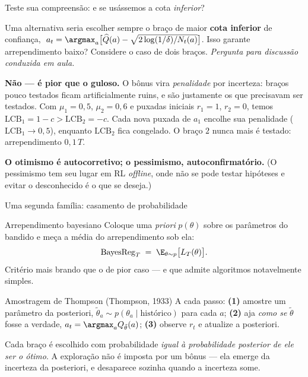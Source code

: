 \documentclass[aspectratio=169, 10pt]{beamer}
\newcommand{\paradiscussao}{\smallskip
  {\footnotesize\color{rlCinza}\itshape Pergunta para discussão conduzida em aula.}}
\newcommand{\Qhat}{\widehat{Q}}
\newcommand{\Nc}{N}                         %
\newcommand{\LCB}{\mathrm{LCB}}
\newcommand{\Reg}{L}
\begin{document}
\begin{frame}{Teste sua compreensão: e se usássemos a cota \emph{inferior}?}
  \begin{quizbox}{}
    Uma alternativa seria escolher sempre o braço de maior \textbf{cota
    inferior} de confiança,
    $\;a_t = \argmax_a \bigl[\Qhat(a) - \sqrt{2\log(1/\delta)/\Nc_t(a)}\bigr]$.
    Isso garante arrependimento baixo? Considere o caso de dois braços.
    \paradiscussao
  \end{quizbox}

  \pause

  \begin{respbox}[fontupper=\footnotesize]
    \textbf{Não --- é pior que o guloso.} O bônus vira \emph{penalidade}
    por incerteza: braços pouco testados ficam artificialmente ruins, e são
    justamente os que precisavam ser testados. Com
    $\mu_1 = 0{,}5$, $\mu_2 = 0{,}6$ e puxadas iniciais $r_1 = 1$,
    $r_2 = 0$, temos $\LCB_1 = 1 - c > \LCB_2 = -c$. Cada nova puxada de
    $a_1$ encolhe sua penalidade ($\LCB_1 \to 0{,}5$), enquanto $\LCB_2$
    fica congelado. O braço $2$ nunca mais é testado: arrependimento
    $0{,}1\,T$.
  \end{respbox}

  \begin{ideiabox}[fontupper=\footnotesize]
    \textbf{O otimismo é autocorretivo; o pessimismo, autoconfirmatório.}
    (O pessimismo tem seu lugar em RL \emph{offline}, onde não se pode
    testar hipóteses e evitar o desconhecido é o que se deseja.)
  \end{ideiabox}
\end{frame}

\begin{frame}{Uma segunda família: casamento de probabilidade}
  \begin{defbox}{Arrependimento bayesiano}
    Coloque uma \emph{priori} $p(\theta)$ sobre os parâmetros do bandido e
    meça a média do arrependimento sob ela:
    \[
      \mathrm{BayesReg}_T \;=\; \E_{\theta \sim p}\bigl[\Reg_T(\theta)\bigr].
    \]
    Critério mais brando que o de pior caso --- e que admite algoritmos
    notavelmente simples.
  \end{defbox}

  \begin{algbox}{Amostragem de Thompson (Thompson, 1933)}
    A cada passo: \textbf{(1)} amostre um parâmetro da posteriori,
    $\tilde\theta_a \sim p(\theta_a \mid \text{histórico})$ para cada $a$;
    \textbf{(2)} aja \emph{como se} $\tilde\theta$ fosse a verdade,
    $a_t = \argmax_a Q_{\tilde\theta}(a)$; \textbf{(3)} observe $r_t$ e
    atualize a posteriori.
  \end{algbox}

  \vspace{-3mm}
  \begin{ideiabox}
    Cada braço é escolhido com probabilidade \emph{igual à probabilidade
    posterior de ele ser o ótimo}. A exploração não é imposta por um bônus
    --- ela emerge da incerteza da posteriori, e desaparece sozinha quando
    a incerteza some.
  \end{ideiabox}
\end{frame}
\end{document}
